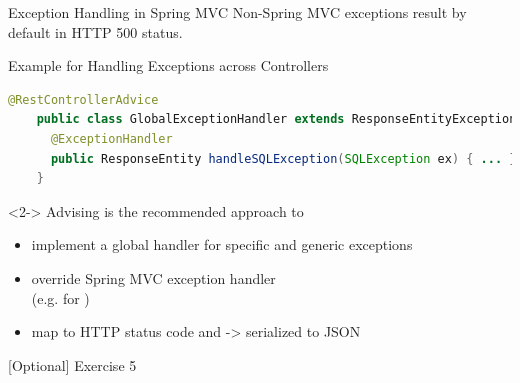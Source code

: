 \begin{frame}[fragile]{Exception Handling in Spring MVC}
Non-Spring MVC exceptions result by default in HTTP 500 status.
\vfill
\begin{block}{Example for Handling Exceptions across Controllers}
\begin{lstlisting}[language=Java,belowskip=-3mm,aboveskip=0mm]
    @RestControllerAdvice
    public class GlobalExceptionHandler extends ResponseEntityExceptionHandler
      @ExceptionHandler
      public ResponseEntity handleSQLException(SQLException ex) { ... }
    }
  \end{lstlisting}
\end{block}
\vfill
\begin{visibleenv}<2->
\small
Advising  is the recommended approach to
\begin{itemize}
    \item implement a global handler for specific and generic exceptions
    \item override Spring MVC exception handler \\(e.g. for )
    \item map to HTTP status code and  -> serialized to JSON
\end{itemize} 
\end{visibleenv}
\end{frame}

\begin{frame}{[Optional] Exercise 5}
	\begin{figure}
	\end{figure}
	\vfill
\end{frame}
